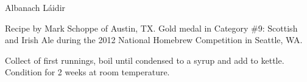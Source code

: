 \begin{recipe}{Albanach Láidir}

\begin{aboutblock}
Recipe by Mark Schoppe of Austin, TX. Gold medal in Category \#9: Scottish and Irish
Ale during the 2012 National Homebrew Competition in Seattle, WA.
\sourceaha
\end{aboutblock}


\begin{methodandtiming}

\begin{mashsteps}
\end{mashsteps}

\begin{fermentationsteps}
\end{fermentationsteps}

\begin{directions}
Collect  of first runnings, boil until condensed to a syrup and add to kettle. 
Condition for 2 weeks at room temperature.
\end{directions}

\end{methodandtiming}

\recipebreak

\begin{ingredientsblock}

\begin{malts}
\end{malts}

\begin{hops}
\end{hops}


\end{ingredientsblock}

\end{recipe}

